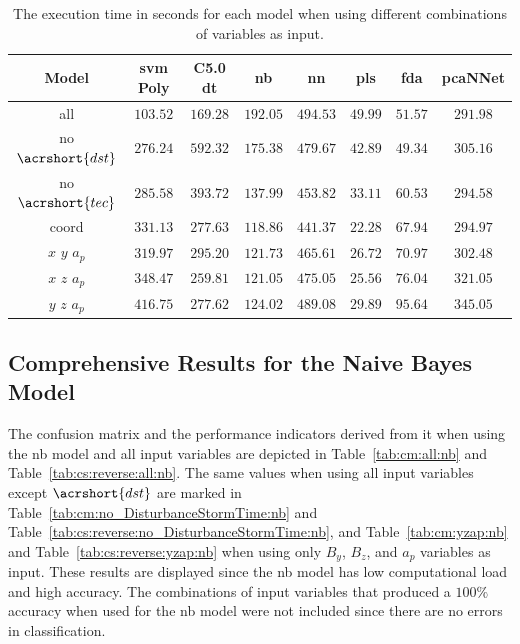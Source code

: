 \documentclass[sn-mathphys-num]{sn-jnl}%
\begin{document}
\begin{table}[!ht]
    \centering
    \caption{The execution time in seconds for each model when using different combinations of variables as input.}
	\label{tab:time:total}
	\begin{tabular}{|c|c|c|c|c|c|c|c|}
		\hline
		Model & \acrshort{svm} Poly & C5.0 \acrshort{dt} & \acrshort{nb} & \acrshort{nn} & \acrshort{pls} & \acrshort{fda} & pcaNNet \\ \hline
		all & $103.52$ & $169.28$ & $192.05$ & $494.53$ & $49.99$ & $51.57$ & $291.98$ \\ \hline
		no $\acrshort{dst}$ & $276.24$ & $592.32$ & $175.38$ & $479.67$ & $42.89$ & $49.34$ & $305.16$ \\ \hline
		no $\acrshort{tec}$ & $285.58$ & $393.72$ & $137.99$ & $453.82$ & $33.11$ & $60.53$ & $294.58$ \\ \hline
		coord & $331.13$ & $277.63$ & $118.86$ & $441.37$ & $22.28$ & $67.94$ & $294.97$ \\ \hline
		$x$ $y$ $a_{p}$ & $319.97$ & $295.20$ & $121.73$ & $465.61$ & $26.72$ & $70.97$ & $302.48$ \\ \hline
		$x$ $z$ $a_{p}$ & $348.47$ & $259.81$ & $121.05$ & $475.05$ & $25.56$ & $76.04$ & $321.05$ \\ \hline
		$y$ $z$ $a_{p}$ & $416.75$ & $277.62$ & $124.02$ & $489.08$ & $29.89$ & $95.64$ & $345.05$ \\ \hline
	\end{tabular}
\end{table}

\subsection{Comprehensive Results for the Naive Bayes Model}

The confusion matrix and the performance indicators derived from it when using the \acrfull{nb} model and all input variables are depicted in Table~\ref{tab:cm:all:nb} and Table~\ref{tab:cs:reverse:all:nb}. The same values when using all input variables except $\acrshort{dst}$ are marked in Table~\ref{tab:cm:no_DisturbanceStormTime:nb} and Table~\ref{tab:cs:reverse:no_DisturbanceStormTime:nb}, and Table~\ref{tab:cm:yzap:nb} and Table~\ref{tab:cs:reverse:yzap:nb} when using only $B_{y}$, $B_{z}$, and $a_{p}$ variables as input. These results are displayed since the \acrshort{nb} model has low computational load and high accuracy. The combinations of input variables that produced a $100\%$ accuracy when used for the \acrshort{nb} model were not included since there are no errors in classification.
\end{document}
